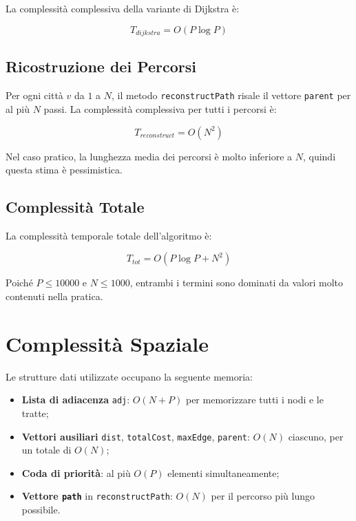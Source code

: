 La complessità complessiva della variante di Dijkstra è:

\begin{equation}
    T_{dijkstra} = O(P \log P)
\end{equation}

\subsection{Ricostruzione dei Percorsi}

Per ogni città $v$ da $1$ a $N$, il metodo \texttt{reconstructPath} 
risale il vettore \texttt{parent} per al più $N$ passi. La complessità 
complessiva per tutti i percorsi è:

\begin{equation}
    T_{reconstruct} = O(N^2)
\end{equation}

Nel caso pratico, la lunghezza media dei percorsi è molto inferiore 
a $N$, quindi questa stima è pessimistica.

\subsection{Complessità Totale}

La complessità temporale totale dell'algoritmo è:

\begin{equation}
    T_{tot} = O(P \log P + N^2)
\end{equation}

Poiché $P \leq 10000$ e $N \leq 1000$, entrambi i termini sono 
dominati da valori molto contenuti nella pratica.

\section{Complessità Spaziale}

Le strutture dati utilizzate occupano la seguente memoria:

\begin{itemize}
    \item \textbf{Lista di adiacenza} \texttt{adj}: $O(N + P)$ per 
    memorizzare tutti i nodi e le tratte;
    \item \textbf{Vettori ausiliari} \texttt{dist}, \texttt{totalCost}, 
    \texttt{maxEdge}, \texttt{parent}: $O(N)$ ciascuno, per un totale 
    di $O(N)$;
    \item \textbf{Coda di priorità}: al più $O(P)$ elementi 
    simultaneamente;
    \item \textbf{Vettore \texttt{path}} in \texttt{reconstructPath}: 
    $O(N)$ per il percorso più lungo possibile.
\end{itemize}

